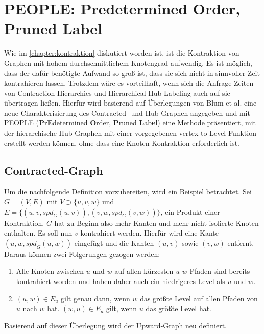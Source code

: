 \chapter{PEOPLE: Predetermined Order, Pruned Label}\label{chapter:people}

Wie im \autoref{chapter:kontraktion} diskutiert worden ist, ist die Kontraktion von Graphen mit hohem durchschnittlichem Knotengrad aufwendig.
Es ist möglich, dass der dafür benötigte Aufwand so groß ist, dass sie sich nicht in sinnvoller Zeit kontrahieren lassen.
Trotzdem wäre es vorteilhaft, wenn sich die Anfrage-Zeiten von Contraction Hierarchies und Hierarchical Hub Labeling auch auf sie übertragen ließen.
Hierfür wird basierend auf Überlegungen von Blum et al. \cite{blum2021sublinear} eine neue Charakterisierung des Contracted- und Hub-Graphen angegeben und mit PEOPLE (\textbf{P}r\textbf{E}determined \textbf{O}rder, \textbf{P}runed \textbf{L}ab\textbf{e}l) eine Methode präsentiert, mit der hierarchische Hub-Graphen mit einer vorgegebenen vertex-to-Level-Funktion erstellt werden können, ohne dass eine Knoten-Kontraktion erforderlich ist.

\section{Contracted-Graph}

Um die nachfolgende Definition vorzubereiten, wird ein Beispiel betrachtet.
Sei $G = (V, E)$ mit $V \supset \{ u, v, w \}$ und $E = \{ (u, v, {spd}_G (u, v)), (v, w, {spd}_G (v, w)) \}$, ein Produkt einer Kontraktion.
$G$ hat zu Beginn also mehr Kanten und mehr nicht-isolierte Knoten enthalten.
Es soll nun $v$ kontrahiert werden.
Hierfür wird eine Kante $(u, w, {spd}_G (u, w))$ eingefügt und die Kanten $(u, v)$ sowie $(v, w)$ entfernt.
Daraus können zwei Folgerungen gezogen werden:

\begin{enumerate}
  \item
        Alle Knoten zwischen $u$ und $w$ auf allen kürzesten $u$-$w$-Pfaden sind bereits kontrahiert worden und haben daher auch ein niedrigeres Level als $u$ und $w$.

  \item
        $(u, w) \in E_u$ gilt genau dann, wenn $w$ das größte Level auf allen Pfaden von $u$ nach $w$ hat.
        $(w, u) \in E_d$ gilt, wenn $u$ das größte Level hat.
\end{enumerate}

Basierend auf dieser Überlegung wird der Upward-Graph neu definiert.

